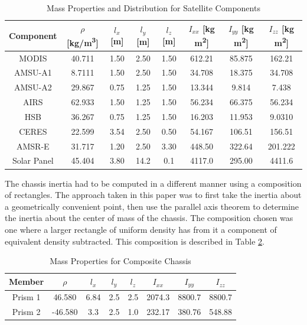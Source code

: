 \begin{table}[H]
    \centering
    \begin{tabular}{c|ccccccc}
    Component & $\rho$ [kg/m\textsuperscript{3}] & $l_x$ [m] & $l_y$ [m] & $l_z$ [m] & $I_{xx}$ [kg m\textsuperscript{2}] & $I_{yy}$ [kg m\textsuperscript{2}] & $I_{zz}$ [kg m\textsuperscript{2}] \\ \hline
    MODIS       &    40.711    &   1.50    &   2.50     &  1.50     &  612.21      &  85.875      &   162.21     \\
    AMSU-A1     &    8.7111    &   1.50    &   2.50     &  1.50     &  34.708     &   18.375     &    34.708    \\
    AMSU-A2     &    29.867    &   0.75    &   1.25     &  1.50     &  13.344     &   9.814     &   7.438     \\
    AIRS        &    62.933    &   1.50    &   1.25     &  1.50     &  56.234     &   66.375     &  56.234      \\
    HSB         &    36.267    &   0.75    &   1.25     &  1.50     &  16.203     &   11.953     &  9.0310      \\
    CERES       &    22.599    &   3.54    &   2.50     &  0.50     &  54.167     &   106.51     &  156.51      \\
    AMSR-E      &    31.717    &   1.20    &   2.50     &  3.30     &  448.50     &   322.64     &  201.222      \\
    Solar Panel &    45.404    &   3.80    &   14.2    &   0.1    &    4117.0    &    295.00    &   4411.6     \\
    \end{tabular}
    \caption{Mass Properties and Distribution for Satellite Components}
    \label{tab:mass_props}
\end{table}

The chassis inertia had to be computed in a different manner using a composition of rectangles. The approach taken in this paper was to first take the inertia about a geometrically convenient point, then use the parallel axis theorem to determine the inertia about the center of mass of the chassis. The composition chosen was one where a larger rectangle of uniform density has from it a component of equivalent density subtracted. This composition is described in Table \ref{tab:composite_chassis}.

\begin{table}[H]
    \centering
    \begin{tabular}{c|ccccccc}
    Member  & $\rho$ & $l_x$ & $l_y$ & $l_z$ & $I_{xx}$ & $I_{yy}$ & $I_{zz}$ \\ \hline
    Prism 1 &   46.580     &   6.84    &   2.5    &   2.5    &  2074.3      &   8800.7     &   8800.7     \\
    Prism 2 &   -46.580     &  3.3     &   2.5    &   1.0    &  232.17      &   380.76     &   548.88     \\  
    \end{tabular}
    \caption{Mass Properties for Composite Chassis}
    \label{tab:composite_chassis}
\end{table}

